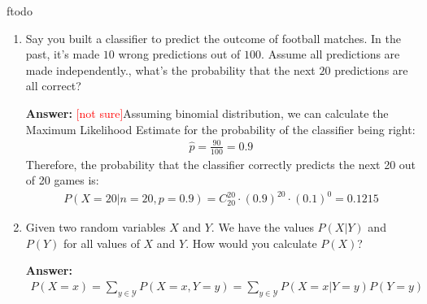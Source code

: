 ƒtodo\documentclass{article}
\newenvironment{QandA}{\begin{enumerate}[label=\arabic*.]}{\end{enumerate}}
\newenvironment{answer}{\par\normalfont \textbf{Answer:}}{}
\newcommand{\g}{\vert}
\newcommand{\notsure}{\textcolor{red}{[not sure]}}
\begin{document}
\begin{QandA}
    \item Say you built a classifier to predict the outcome of football matches. In the past, it's made $10$ wrong predictions out of $100$. Assume all predictions are made independently., what's the probability that the next $20$ predictions are all correct?
    \begin{answer}
        \notsure Assuming binomial distribution, we can calculate the Maximum Likelihood Estimate for the probability of the classifier being right:
        \begin{align*}
            \hat{p} = \frac{90}{100} = 0.9 
        \end{align*}
        Therefore, the probability that the classifier correctly predicts the next 20 out of 20 games is:
        \begin{align*}
            P(X=20 \g n=20, p=0.9) = C_{20}^{20} \cdot (0.9)^{20} \cdot (0.1)^{0} = 0.1215
        \end{align*}
    \end{answer}
    
    \item Given two random variables $X$ and $Y$. We have the values $P(X \g Y)$ and $P(Y)$ for all values of $X$ and $Y$. How would you calculate $P(X)$?
    \begin{answer}
        \begin{align*}
            P(X=x) = \sum_{y \in \mathcal{Y}} P(X=x, Y=y) = \sum_{y \in \mathcal{Y}} P(X=x \g Y=y) P(Y=y)
        \end{align*}
    \end{answer}


\end{QandA}
\end{document}
